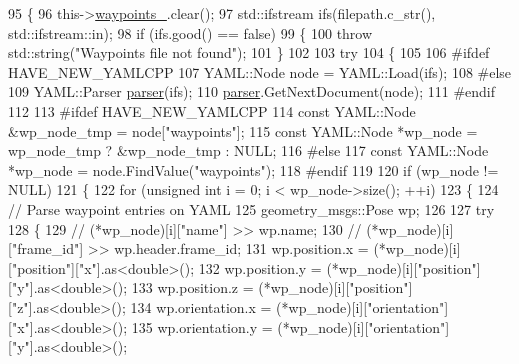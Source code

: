 \begin{DoxyCode}
95 \{
96   this->\hyperlink{classmove__base__z__client_1_1WaypointNavigator_a83e4e39987eaf1c8856d32d581eb4cd0}{waypoints\_}.clear();
97   std::ifstream ifs(filepath.c\_str(), std::ifstream::in);
98   \textcolor{keywordflow}{if} (ifs.good() == \textcolor{keyword}{false})
99   \{
100     \textcolor{keywordflow}{throw} std::string(\textcolor{stringliteral}{"Waypoints file not found"});
101   \}
102 
103   \textcolor{keywordflow}{try}
104   \{
105 
106 \textcolor{preprocessor}{#ifdef HAVE\_NEW\_YAMLCPP}
107     YAML::Node node = YAML::Load(ifs);
108 \textcolor{preprocessor}{#else}
109     YAML::Parser \hyperlink{namespacegenerate__debs_a4a9ae4bb85fc62d7973ea3d09ced6c26}{parser}(ifs);
110     \hyperlink{namespacegenerate__debs_a4a9ae4bb85fc62d7973ea3d09ced6c26}{parser}.GetNextDocument(node);
111 \textcolor{preprocessor}{#endif}
112 
113 \textcolor{preprocessor}{#ifdef HAVE\_NEW\_YAMLCPP}
114     \textcolor{keyword}{const} YAML::Node &wp\_node\_tmp = node[\textcolor{stringliteral}{"waypoints"}];
115     \textcolor{keyword}{const} YAML::Node *wp\_node = wp\_node\_tmp ? &wp\_node\_tmp : NULL;
116 \textcolor{preprocessor}{#else}
117     \textcolor{keyword}{const} YAML::Node *wp\_node = node.FindValue(\textcolor{stringliteral}{"waypoints"});
118 \textcolor{preprocessor}{#endif}
119 
120     \textcolor{keywordflow}{if} (wp\_node != NULL)
121     \{
122       \textcolor{keywordflow}{for} (\textcolor{keywordtype}{unsigned} \textcolor{keywordtype}{int} i = 0; i < wp\_node->size(); ++i)
123       \{
124         \textcolor{comment}{// Parse waypoint entries on YAML}
125         geometry\_msgs::Pose wp;
126 
127         \textcolor{keywordflow}{try}
128         \{
129           \textcolor{comment}{// (*wp\_node)[i]["name"] >> wp.name;}
130           \textcolor{comment}{// (*wp\_node)[i]["frame\_id"] >> wp.header.frame\_id;}
131           wp.position.x = (*wp\_node)[i][\textcolor{stringliteral}{"position"}][\textcolor{stringliteral}{"x"}].as<\textcolor{keywordtype}{double}>();
132           wp.position.y = (*wp\_node)[i][\textcolor{stringliteral}{"position"}][\textcolor{stringliteral}{"y"}].as<\textcolor{keywordtype}{double}>();
133           wp.position.z = (*wp\_node)[i][\textcolor{stringliteral}{"position"}][\textcolor{stringliteral}{"z"}].as<\textcolor{keywordtype}{double}>();
134           wp.orientation.x = (*wp\_node)[i][\textcolor{stringliteral}{"orientation"}][\textcolor{stringliteral}{"x"}].as<\textcolor{keywordtype}{double}>();
135           wp.orientation.y = (*wp\_node)[i][\textcolor{stringliteral}{"orientation"}][\textcolor{stringliteral}{"y"}].as<\textcolor{keywordtype}{double}>();

\end{DoxyCode}
